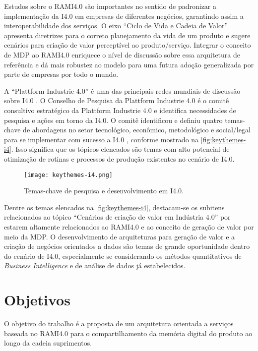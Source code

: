 	Estudos sobre o RAMI4.0 são importantes no sentido de padronizar a implementação da I4.0 em empresas de diferentes negócios, garantindo assim a interoperabilidade dos serviços. O eixo ``Ciclo de Vida e Cadeia de Valor'' apresenta diretrizes para o correto planejamento da vida de um produto e sugere cenários para criação de valor perceptível ao produto/serviço. Integrar o conceito de MDP ao RAMI4.0 enriquece o nível de discussão sobre essa arquitetura de referência e dá mais robustez ao modelo para uma futura adoção generalizada por parte de empresas por todo o mundo.

	A ``Plattform Industrie 4.0'' é uma das principais redes mundiais de discussão sobre I4.0 \cite{kagermann2013recommendations, acatech2014plattform, germany2019plattform}. O Conselho de Pesquisa da Plattform Industrie 4.0 é o comitê consultivo estratégico da Plattform Industrie 4.0 e identifica necessidades de pesquisa e ações em torno da I4.0. O comitê identificou e definiu quatro temas-chave de abordagens no setor tecnológico, econômico, metodológico e social/legal para se implementar com sucesso a I4.0 \cite{hirsch-kreinsen2019keythemes}, conforme mostrado na \autoref{fig:keythemes-i4}. Isso significa que os tópicos elencados são temas com alto potencial de otimização de rotinas e processos de produção existentes no cenário de I4.0.
	
	\begin{figure}[htb]
		\centering
		\caption{Temas-chave de pesquisa e desenvolvimento em I4.0.}
		\label{fig:keythemes-i4}
		\texttt{[image: keythemes-i4.png]}
	\end{figure}

	Dentre os temas elencados na \autoref{fig:keythemes-i4}, destacam-se os subitens relacionados ao tópico ``Cenários de criação de valor em Indústria 4.0'' por estarem altamente relacionados ao RAMI4.0 e ao conceito de geração de valor por meio da MDP. O desenvolvimento de arquiteturas para geração de valor e a criação de negócios orientados a dados são temas de grande oportunidade dentro do cenário de I4.0, especialmente se considerando os métodos quantitativos de \textit{Business Intelligence} e de análise de dados já estabelecidos.

\section{Objetivos}

	O objetivo do trabalho é a proposta de um arquitetura orientada a serviços baseada no RAMI4.0 para o compartilhamento da memória digital do produto ao longo da cadeia suprimentos.

